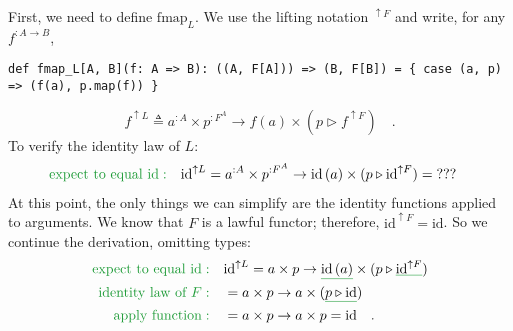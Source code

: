 First, we need to define $\text{fmap}_{L}$. We use the lifting notation
$^{\uparrow F}$ and write, for any $f^{:A\rightarrow B}$,
\begin{lstlisting}
def fmap_L[A, B](f: A => B): ((A, F[A])) => (B, F[B]) = { case (a, p) => (f(a), p.map(f)) }
\end{lstlisting}
\[
f^{\uparrow L}\triangleq a^{:A}\times p^{:F^{A}}\rightarrow f(a)\times(p\triangleright f^{\uparrow F})\quad.
\]
To verify the identity law of $L$:
\begin{align*}
{\color{greenunder}\text{expect to equal }\text{id}:}\quad & \text{id}^{\uparrow L}=a^{:A}\times p^{:F^{A}}\rightarrow\text{id}\,(a)\times(p\triangleright\text{id}^{\uparrow F})=\text{???}
\end{align*}
At this point, the only things we can simplify are the identity functions
applied to arguments. We know that $F$ is a lawful functor; therefore,
$\text{id}^{\uparrow F}=\text{id}$. So we continue the derivation,
omitting types:
\begin{align*}
{\color{greenunder}\text{expect to equal }\text{id}:}\quad & \text{id}^{\uparrow L}=a\times p\rightarrow\gunderline{\text{id}\,(a)}\times(p\triangleright\gunderline{\text{id}^{\uparrow F}})\\
{\color{greenunder}\text{identity law of }F:}\quad & =a\times p\rightarrow a\times(\gunderline{p\triangleright\text{id}})\\
{\color{greenunder}\text{apply function}:}\quad & =a\times p\rightarrow a\times p=\text{id}\quad.
\end{align*}

